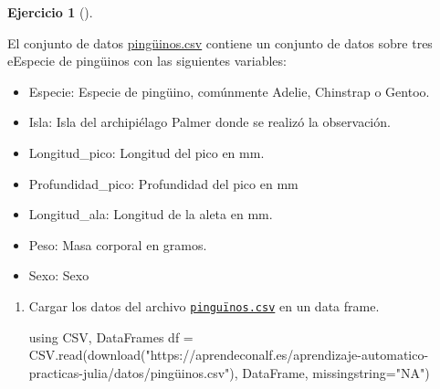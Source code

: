 \documentclass[
  a4paper,
]{scrreport}
\newenvironment{Shaded}{\begin{snugshade}}{\end{snugshade}}
\newcommand{\BuiltInTok}[1]{\textcolor[rgb]{0.00,0.23,0.31}{#1}}
\newcommand{\FunctionTok}[1]{\textcolor[rgb]{0.28,0.35,0.67}{#1}}
\newcommand{\ImportTok}[1]{\textcolor[rgb]{0.00,0.46,0.62}{#1}}
\newcommand{\NormalTok}[1]{\textcolor[rgb]{0.00,0.23,0.31}{#1}}
\newcommand{\OperatorTok}[1]{\textcolor[rgb]{0.37,0.37,0.37}{#1}}
\newcommand{\StringTok}[1]{\textcolor[rgb]{0.13,0.47,0.30}{#1}}
\providecommand{\tightlist}{%
  \setlength{\itemsep}{0pt}\setlength{\parskip}{0pt}}\usepackage{longtable,booktabs,array}
\theoremstyle{definition}
\newtheorem{exercise}{Ejercicio}[chapter]
\theoremstyle{remark}
\begin{document}
\begin{exercise}[]\protect\hypertarget{exr-arboles-decision-2}{}\label{exr-arboles-decision-2}

El conjunto de datos \href{datos/pingüinos.csv}{pingüinos.csv} contiene
un conjunto de datos sobre tres eEspecie de pingüinos con las siguientes
variables:

\begin{itemize}
\tightlist
\item
  Especie: Especie de pingüino, comúnmente Adelie, Chinstrap o Gentoo.
\item
  Isla: Isla del archipiélago Palmer donde se realizó la observación.
\item
  Longitud\_pico: Longitud del pico en mm.
\item
  Profundidad\_pico: Profundidad del pico en mm
\item
  Longitud\_ala: Longitud de la aleta en mm.
\item
  Peso: Masa corporal en gramos.
\item
  Sexo: Sexo
\end{itemize}

\begin{enumerate}
\def\labelenumi{\alph{enumi}.}
\item
  Cargar los datos del archivo
  \href{https://aprendeconalf.es/aprendizaje-automatico-practicas-julia/datos/pingüinos.csv}{\texttt{pinguïnos.csv}}
  en un data frame.

  \begin{tcolorbox}[enhanced jigsaw, left=2mm, colback=white, coltitle=black, opacitybacktitle=0.6, titlerule=0mm, breakable, bottomrule=.15mm, toptitle=1mm, bottomtitle=1mm, colbacktitle=quarto-callout-tip-color!10!white, opacityback=0, rightrule=.15mm, title=\textcolor{quarto-callout-tip-color}{\faLightbulb}\hspace{0.5em}{Solución}, colframe=quarto-callout-tip-color-frame, arc=.35mm, leftrule=.75mm, toprule=.15mm]

\begin{Shaded}
\begin{Highlighting}[]
\ImportTok{using} \BuiltInTok{CSV}\NormalTok{, }\BuiltInTok{DataFrames}
\NormalTok{df }\OperatorTok{=}\NormalTok{ CSV.}\FunctionTok{read}\NormalTok{(}\FunctionTok{download}\NormalTok{(}\StringTok{"https://aprendeconalf.es/aprendizaje{-}automatico{-}practicas{-}julia/datos/pingüinos.csv"}\NormalTok{), DataFrame, missingstring}\OperatorTok{=}\StringTok{"NA"}\NormalTok{)}
\end{Highlighting}
\end{Shaded}


\end{tcolorbox}
\end{enumerate}
\end{exercise}
\end{document}
